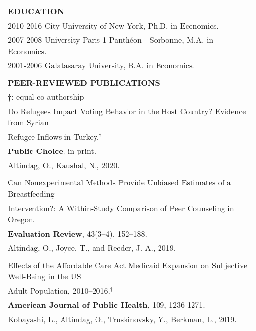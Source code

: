 \documentclass[12 pt]{article}
\begin{document}
\begin{longtable}{ccccc}
\\


\multicolumn{5}{l}{\textbf{EDUCATION}}\\[2 pt]
  \multicolumn{4}{l}{2010\phantom{7}-\phantom{8}2016 \phantom{0000}City University of New York, Ph.D. in Economics.}     \\
    \multicolumn{4}{l}{2007\phantom{1}-\phantom{6}2008 \phantom{000..}University Paris 1 Panth\'{e}on - Sorbonne, M.A. in Economics.} \\
\multicolumn{4}{l}{2001\phantom{1}-\phantom{0}2006 \phantom{000.} Galatasaray University,  B.A. in Economics.}  \\
\\

\multicolumn{5}{l}{\textbf{PEER-REVIEWED PUBLICATIONS }} \\ 
 \multicolumn{5}{l}{\footnotesize{$\dagger$: equal co-authorship}} \\[4 pt]



   \multicolumn{5}{l}{Do Refugees Impact Voting Behavior in the Host Country? Evidence from Syrian} \\
    \multicolumn{5}{l}{Refugee Inflows in Turkey.$^{\dagger}$} \\
     \multicolumn{5}{l}{\textbf{Public Choice}, in print.} \\  
 \multicolumn{5}{l}{Altindag, O., Kaushal, N., 2020.} \\
\\

   \multicolumn{5}{l}{Can Nonexperimental Methods Provide Unbiased Estimates of a Breastfeeding} \\
  \multicolumn{5}{l}{Intervention?: A Within-Study Comparison of Peer Counseling in Oregon. } \\
    \multicolumn{5}{l}{\textbf{Evaluation Review}, 43(3–4), 152–188.} \\
 \multicolumn{5}{l}{Altindag, O., Joyce, T., and Reeder, J. A., 2019.} \\



 \\ 

  \multicolumn{5}{l}{Effects of the Affordable Care Act Medicaid Expansion on Subjective Well-Being in the US} \\
    \multicolumn{5}{l}{Adult Population, 2010–2016.$^{\dagger}$} \\
   \multicolumn{5}{l}{\textbf{American Journal of Public Health}, 109, 1236-1271.} \\
   \multicolumn{5}{l}{Kobayashi, L., Altindag, O., Truskinovsky, Y., Berkman, L., 2019.}  \\


\end{longtable}
\end{document}
